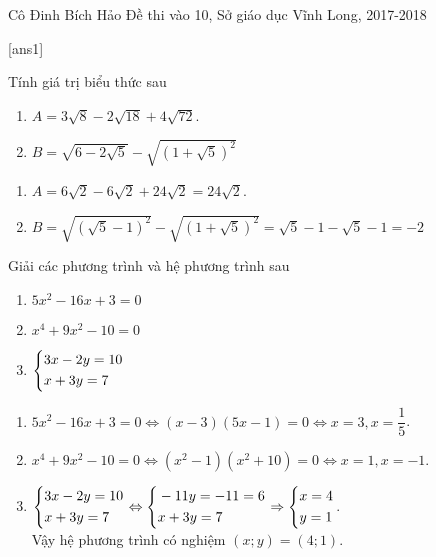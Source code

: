 \begin{name}
{Cô  Đinh Bích Hảo}
{Đề thi vào 10, Sở giáo dục Vĩnh Long, 2017-2018}
\end{name}
\setcounter{ex}{0}
[ans1]
\begin{ex}%
    Tính giá trị biểu thức sau
    \begin{enumerate}
        \item  $A=3\sqrt{8}-2\sqrt{18}+4\sqrt{72}$.
        \item $B=\sqrt{6-2\sqrt{5}}-\sqrt{(1+\sqrt{5})^2}$
    \end{enumerate}
\loigiai
    {
    \begin{enumerate}
        \item $A=6\sqrt{2}-6\sqrt{2}+24\sqrt{2}=24\sqrt{2}$.
        \item $B=\sqrt{(\sqrt{5}-1)^2}-\sqrt{(1+\sqrt{5})^2}=\sqrt{5}-1-\sqrt{5}-1=-2$
    \end{enumerate}
    }
\end{ex}

\begin{ex}%
    Giải các phương trình và hệ phương trình sau
    \begin{enumerate}
        \item $5x^2-16x+3=0$
        \item $x^4+9x^2-10=0$
        \item $\left\{\begin{aligned}&3x-2y=10\\&x+3y=7\end{aligned}\right.$
    \end{enumerate}
\loigiai
    {
    \begin{enumerate}
        \item $5x^2-16x+3=0 \Leftrightarrow (x-3)(5x-1)=0 \Leftrightarrow x=3,x=\dfrac{1}{5}$. 
        \item $x^4+9x^2-10=0 \Leftrightarrow (x^2-1)(x^2+10)=0 \Leftrightarrow x=1,x=-1$.
        \item $\left\{\begin{aligned}&3x-2y=10\\&x+3y=7\end{aligned}\right.\Leftrightarrow \left\{\begin{aligned}& -11y=-11=6\\ & x+3y=7\end{aligned}\right. \Rightarrow\left\{\begin{aligned}& x=4\\ & y=1\end{aligned}\right.$.\\
        Vậy hệ phương trình có nghiệm $(x;y)=(4;1)$.
    \end{enumerate}
    }
\end{ex}

